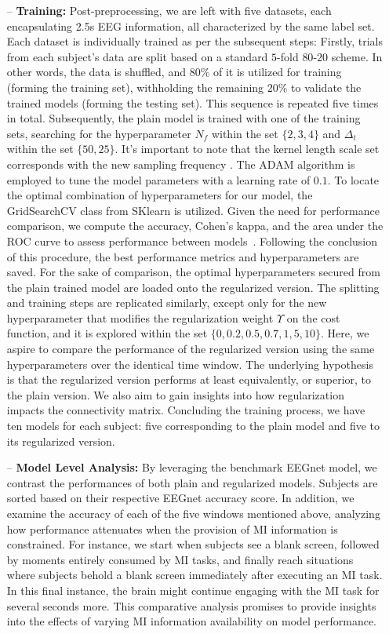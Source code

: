 \begin{itemize}
    \item[--] \textbf{Training:} Post-preprocessing, we are left with five datasets, each encapsulating 2.5s EEG information, all characterized by the same label set. Each dataset is individually trained as per the subsequent steps: Firstly, trials from each subject's data are split based on a standard $5$-fold $80$-$20$ scheme. In other words, the data is shuffled, and $80\%$ of it is utilized for training (forming the training set), withholding the remaining $20\%$ to validate the trained models (forming the testing set). This sequence is repeated five times in total. Subsequently, the plain model is trained with one of the training sets, searching for the hyperparameter $N_f$ within the set $\{2,3,4\}$ and $\Delta_t$ within the set $\{50,25\}$. It's important to note that the kernel length scale set corresponds with the new sampling frequency \cite{lawhern2018eegnet}. The ADAM algorithm is employed to tune the model parameters with a learning rate of $0.1$. To locate the optimal combination of hyperparameters for our model, the GridSearchCV class from SKlearn is utilized. Given the need for performance comparison, we compute the accuracy, Cohen's kappa, and the area under the ROC curve to assess performance between models~\cite{warrens2015five,geron2022hands}. Following the conclusion of this procedure, the best performance metrics and hyperparameters are saved. For the sake of comparison, the optimal hyperparameters secured from the plain trained model are loaded onto the regularized version. The splitting and training steps are replicated similarly, except only for the new hyperparameter that modifies the regularization weight $\Upsilon$ on the cost function, and it is explored within the set $\{0,0.2,0.5,0.7,1,5,10\}$. Here, we aspire to compare the performance of the regularized version using the same hyperparameters over the identical time window. The underlying hypothesis is that the regularized version performs at least equivalently, or superior, to the plain version. We also aim to gain insights into how regularization impacts the connectivity matrix. Concluding the training process, we have ten models for each subject: five corresponding to the plain model and five to its regularized version.

    \item[--] \textbf{Model Level Analysis:} By leveraging the benchmark EEGnet model, we contrast the performances of both plain and regularized models. Subjects are sorted based on their respective EEGnet accuracy score. In addition, we examine the accuracy of each of the five windows mentioned above, analyzing how performance attenuates when the provision of MI information is constrained. For instance, we start when subjects see a blank screen, followed by moments entirely consumed by MI tasks, and finally reach situations where subjects behold a blank screen immediately after executing an MI task. In this final instance, the brain might continue engaging with the MI task for several seconds more. This comparative analysis promises to provide insights into the effects of varying MI information availability on model performance. 


\end{itemize}
